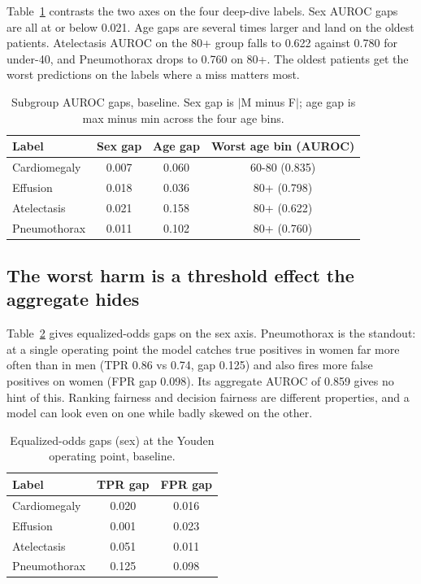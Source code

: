 \documentclass[11pt]{article}
\begin{document}
Table~\ref{tab:auroc} contrasts the two axes on the four deep-dive labels. Sex AUROC gaps are all at or below 0.021. Age gaps are several times larger and land on the oldest patients. Atelectasis AUROC on the 80+ group falls to 0.622 against 0.780 for under-40, and Pneumothorax drops to 0.760 on 80+. The oldest patients get the worst predictions on the labels where a miss matters most.

\begin{table}[h]
\centering
\caption{Subgroup AUROC gaps, baseline. Sex gap is $|$M minus F$|$; age gap is max minus min across the four age bins.}
\label{tab:auroc}
\begin{tabular}{lccc}
\toprule
Label & Sex gap & Age gap & Worst age bin (AUROC) \\
\midrule
Cardiomegaly & 0.007 & 0.060 & 60-80 (0.835) \\
Effusion     & 0.018 & 0.036 & 80+ (0.798) \\
Atelectasis  & 0.021 & 0.158 & 80+ (0.622) \\
Pneumothorax & 0.011 & 0.102 & 80+ (0.760) \\
\bottomrule
\end{tabular}
\end{table}

\subsection{The worst harm is a threshold effect the aggregate hides}

Table~\ref{tab:eqodds} gives equalized-odds gaps on the sex axis. Pneumothorax is the standout: at a single operating point the model catches true positives in women far more often than in men (TPR 0.86 vs 0.74, gap 0.125) and also fires more false positives on women (FPR gap 0.098). Its aggregate AUROC of 0.859 gives no hint of this. Ranking fairness and decision fairness are different properties, and a model can look even on one while badly skewed on the other.

\begin{table}[h]
\centering
\caption{Equalized-odds gaps (sex) at the Youden operating point, baseline.}
\label{tab:eqodds}
\begin{tabular}{lcc}
\toprule
Label & TPR gap & FPR gap \\
\midrule
Cardiomegaly & 0.020 & 0.016 \\
Effusion     & 0.001 & 0.023 \\
Atelectasis  & 0.051 & 0.011 \\
Pneumothorax & 0.125 & 0.098 \\
\bottomrule
\end{tabular}
\end{table}
\end{document}
